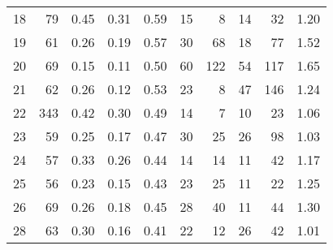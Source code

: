 \begin{tabular}{rrrrrrrrrr}
18 &       79 &                             0.45 &                             0.31 &                             0.59 &              15 &               8 &                                 14 &                              32 &       1.20 \\
19 &       61 &                             0.26 &                             0.19 &                             0.57 &              30 &              68 &                                 18 &                              77 &       1.52 \\
20 &       69 &                             0.15 &                             0.11 &                             0.50 &              60 &             122 &                                 54 &                             117 &       1.65 \\
21 &       62 &                             0.26 &                             0.12 &                             0.53 &              23 &               8 &                                 47 &                             146 &       1.24 \\
22 &      343 &                             0.42 &                             0.30 &                             0.49 &              14 &               7 &                                 10 &                              23 &       1.06 \\
23 &       59 &                             0.25 &                             0.17 &                             0.47 &              30 &              25 &                                 26 &                              98 &       1.03 \\
24 &       57 &                             0.33 &                             0.26 &                             0.44 &              14 &              14 &                                 11 &                              42 &       1.17 \\
25 &       56 &                             0.23 &                             0.15 &                             0.43 &              23 &              25 &                                 11 &                              22 &       1.25 \\
26 &       69 &                             0.26 &                             0.18 &                             0.45 &              28 &              40 &                                 11 &                              44 &       1.30 \\
28 &       63 &                             0.30 &                             0.16 &                             0.41 &              22 &              12 &                                 26 &                              42 &       1.01 \\

\end{tabular}

